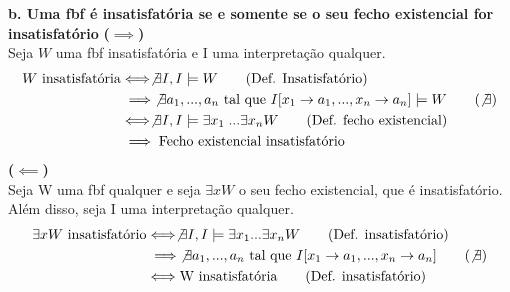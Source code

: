\textbf{b. Uma fbf é insatisfatória se e somente se o seu fecho existencial for insatisfatório}
\textbf{($\implies$)}
\\
Seja $W$ uma fbf insatisfatória e I uma interpretação qualquer.
\begin{align*}
    W \text{ insatisfatória} 
    &\Longleftrightarrow \not\exists I, I \models W \tag*{(Def. Insatisfatório)} \\
    &\implies \not \exists a_1,...,a_n \text{ tal que } I[x_1 \rightarrow a_1,...,x_n \rightarrow a_n] \models W \tag*{($\not\exists$)} \\
    &\Longleftrightarrow \not\exists I, I \models \exists x_1 \;... \exists x_nW \tag*{(Def. fecho existencial)} \\
    &\implies \text{Fecho existencial insatisfatório}
\end{align*}
\textbf{($\impliedby$)}
\\
Seja W uma fbf qualquer e seja $\exists x W$ o seu fecho existencial, que é insatisfatório. Além disso, seja I uma interpretação qualquer.
\begin{align*}
     \exists x W\text{ insatisfatório} 
    &\Longleftrightarrow \not\exists I, I \models \exists x_1 ... \exists x_nW \tag*{(Def. insatisfatório)} \\
    &\implies \not\exists a_1,... , a_n  \text{ tal que }I[x_1\rightarrow a_1,...,x_n \rightarrow a_n] \tag*{($\not\exists$)} \\
    &\Longleftrightarrow \text{W insatisfatória} \tag*{(Def. insatisfatório)}
\end{align*}
